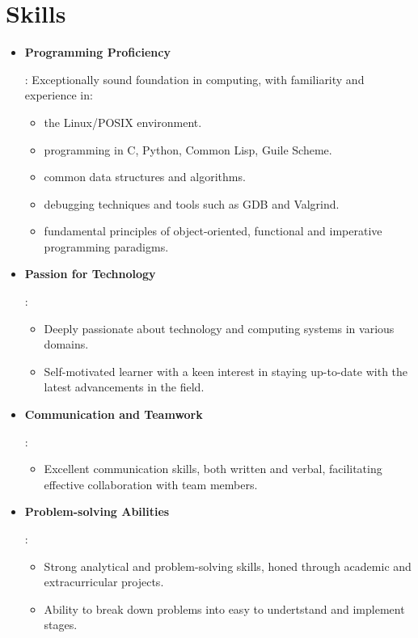 \documentclass[letterpaper,11pt]{article}
\newcommand{\resumeItem}[2]{
  \item\small{
    \textbf{#1}{: #2 \vspace{-2pt}}
  }
}
\newcommand{\resumeSubItem}[2]{\resumeItem{#1}{#2}\vspace{-4pt}}
\newcommand{\resumeSubHeadingListStart}{\begin{itemize}[leftmargin=*]}
\newcommand{\resumeSubHeadingListEnd}{\end{itemize}}
\begin{document}
  \section{Skills}
  \resumeSubHeadingListStart
  \resumeSubItem{Programming Proficiency}
  {Exceptionally sound foundation in computing, with familiarity and experience in:
    \begin{itemize}
      \item{the Linux/POSIX environment.}
      \item{programming in C, Python, Common Lisp, Guile Scheme.}
      \item{common data structures and algorithms.}
      \item{debugging techniques and tools such as GDB and Valgrind.}
      \item{fundamental principles of object-oriented, functional and imperative programming paradigms.}
    \end{itemize}}
  \resumeSubItem{Passion for Technology}
  {\begin{itemize}
     \item{Deeply passionate about technology and computing systems in various domains.}
     \item{Self-motivated learner with a keen interest in staying up-to-date with the latest advancements in the field.}
   \end{itemize}}
 \resumeSubItem{Communication and Teamwork}
 {\begin{itemize}
    \item{Excellent communication skills, both written and verbal, facilitating effective collaboration with team members.}
  \end{itemize}}
\resumeSubItem{Problem-solving Abilities}
{\begin{itemize}
   \item{Strong analytical and problem-solving skills, honed through academic and extracurricular projects.}
   \item{Ability to break down problems into easy to undertstand and implement stages.}
         \end{itemize}}
\resumeSubHeadingListEnd
\end{document}
